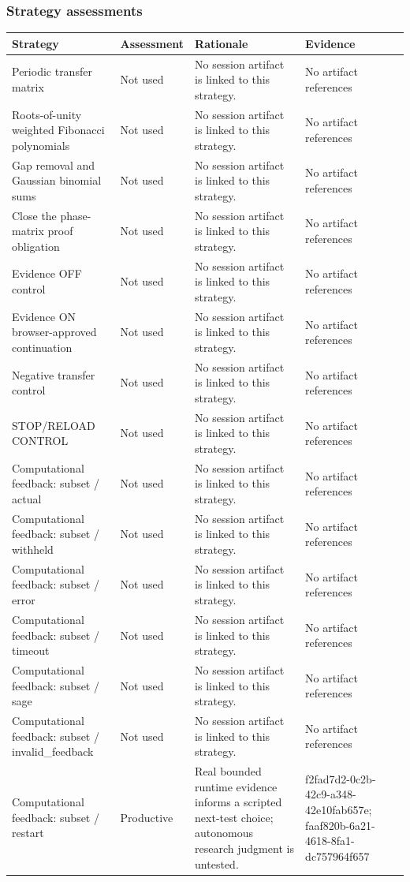 \documentclass[11pt]{article}
\begin{document}
\subsubsection*{Strategy assessments}
\begin{longtable}{>{\raggedright\arraybackslash}p{.16\linewidth}>{\raggedright\arraybackslash}p{.15\linewidth}>{\raggedright\arraybackslash}p{.40\linewidth}>{\raggedright\arraybackslash}p{.17\linewidth}}
\toprule Strategy & Assessment & Rationale & Evidence \\
\midrule\endhead
Periodic transfer matrix & Not used & No session artifact is linked to this strategy. & No artifact references \\
Roots-of-unity weighted Fibonacci polynomials & Not used & No session artifact is linked to this strategy. & No artifact references \\
Gap removal and Gaussian binomial sums & Not used & No session artifact is linked to this strategy. & No artifact references \\
Close the phase-matrix proof obligation & Not used & No session artifact is linked to this strategy. & No artifact references \\
Evidence OFF control & Not used & No session artifact is linked to this strategy. & No artifact references \\
Evidence ON browser-approved continuation & Not used & No session artifact is linked to this strategy. & No artifact references \\
Negative transfer control & Not used & No session artifact is linked to this strategy. & No artifact references \\
STOP/RELOAD CONTROL & Not used & No session artifact is linked to this strategy. & No artifact references \\
Computational feedback: subset / actual & Not used & No session artifact is linked to this strategy. & No artifact references \\
Computational feedback: subset / withheld & Not used & No session artifact is linked to this strategy. & No artifact references \\
Computational feedback: subset / error & Not used & No session artifact is linked to this strategy. & No artifact references \\
Computational feedback: subset / timeout & Not used & No session artifact is linked to this strategy. & No artifact references \\
Computational feedback: subset / sage & Not used & No session artifact is linked to this strategy. & No artifact references \\
Computational feedback: subset / invalid\_feedback & Not used & No session artifact is linked to this strategy. & No artifact references \\
Computational feedback: subset / restart & Productive & Real bounded runtime evidence informs a scripted next-test choice; autonomous research judgment is untested. & f2fad7d2-0c2b-42c9-a348-42e10fab657e; faaf820b-6a21-4618-8fa1-dc757964f657 \\
\bottomrule
\end{longtable}
\end{document}
